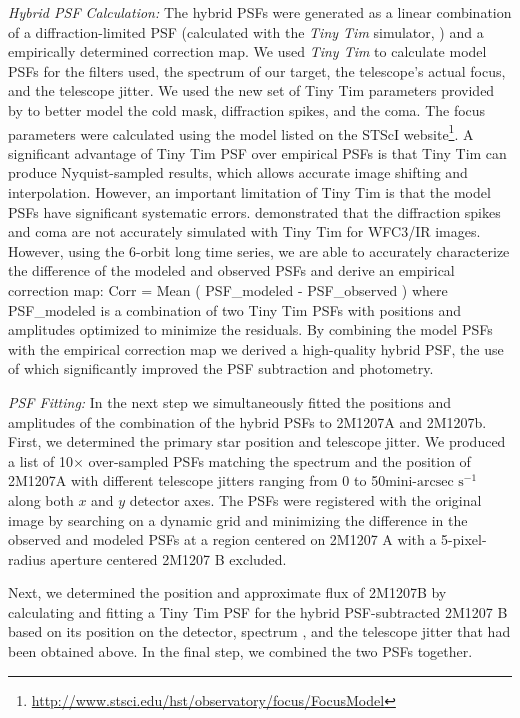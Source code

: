 \documentclass[apj]{emulateapj}
\begin{document}
{\em Hybrid PSF Calculation:} The hybrid PSFs were generated as a linear combination of a diffraction-limited PSF (calculated with the {\em Tiny Tim}  simulator, \citealt[e.g.][]{Krist}) and a empirically determined correction map. We used {\em Tiny Tim} to calculate model PSFs for the filters used,
the spectrum of our target, the telescope's actual focus, and the telescope jitter. 
We used the new set of Tiny Tim parameters provided by \cite{Biretta2014} to better model the cold
mask, diffraction spikes, and the coma. The focus parameters were calculated using the model listed on the STScI website\footnote{\url{http://www.stsci.edu/hst/observatory/focus/FocusModel}}. 
A significant advantage of Tiny Tim PSF over empirical PSFs is that Tiny Tim can
produce Nyquist-sampled results, which allows accurate image shifting and interpolation. However, an important limitation of Tiny Tim is that the model PSFs have significant systematic
errors. \cite{Biretta2014} demonstrated that the diffraction
spikes and coma are not accurately simulated with Tiny Tim for WFC3/IR
images. However, using the 6-orbit long time series, we are able
to accurately characterize the difference of the modeled and observed PSFs and derive an empirical correction map: Corr = Mean ( PSF_modeled - PSF_observed ) where PSF_modeled is a combination of two Tiny Tim PSFs with positions and amplitudes optimized to minimize the residuals.
By combining the model PSFs with the empirical correction map we derived
a high-quality hybrid PSF, the use of which significantly improved the PSF
subtraction and photometry. 

{\em PSF Fitting:} In the next step we simultaneously fitted the positions and amplitudes of the combination of the hybrid PSFs to 2M1207A and 2M1207b. First, we determined the primary star position and telescope jitter. We produced a list of 10$\times$ over-sampled PSFs matching the spectrum \citep{Bonnefoy2014} and the position of 2M1207A with different telescope jitters ranging from 0 to 50$\mbox{mini-arcsec s}^{-1}$ along
both $x$ and $y$ detector axes. The PSFs were registered with the original image by searching on a dynamic grid and minimizing the difference in the observed and modeled PSFs at a region centered on 2M1207 A with a 5-pixel-radius aperture centered 2M1207 B excluded. 

Next, we determined the position and approximate flux of 2M1207B by calculating and fitting a Tiny Tim PSF for the hybrid PSF-subtracted 2M1207 B based on its position on the detector, spectrum \citep{Patience2010}, and
the telescope jitter that had been obtained above. In the final step,
we combined the two PSFs together. 
\end{document}
